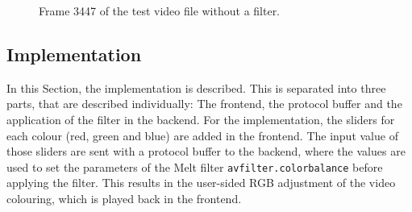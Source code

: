 \documentclass[../MasterThesis.tex]{subfiles}
\begin{document}
\begin{figure}[H]
	\begin{center}
		\caption[Frame 3447 of the test video file without a filter.]{Frame 3447 of the test video file without a filter.}
		\label{figure:septo_nofilter}
	\end{center}
\end{figure}












\subsection{Implementation} \label{subsection:implementation}

In this Section, the implementation is described. This is separated into three parts, that are described individually: The frontend, the protocol buffer and the application of the filter in the backend. For the implementation, the sliders for each colour (red, green and blue) are added in the frontend. The input value of those sliders are sent with a protocol buffer to the backend, where the values are used to set the parameters of the Melt filter \texttt{avfilter.colorbalance} before applying the filter. This results in the user-sided RGB adjustment of the video colouring, which is played back in the frontend.

\end{document}
